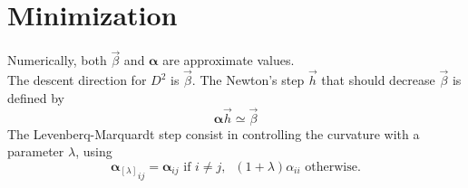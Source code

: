 \documentclass[aps,twocolumn]{revtex4}
\newcommand{\mymat}[1]{\bm{#1}}
\begin{document}
\section{Minimization}
Numerically, both $\vec{\beta}$ and $\mymat{\alpha}$ are approximate values.\\
The descent direction for $D^2$ is $\vec{\beta}$. The Newton's step $\vec{h}$ that should decrease $\vec{\beta}$ is defined by
\begin{equation}
	 \mymat{\alpha} \vec{h} \simeq \vec{\beta}
\end{equation}
The Levenberq-Marquardt step consist in controlling the curvature with a parameter $\lambda$, using
\begin{equation}
	{\mymat{\alpha}_{[\lambda]}}_{ij} = \mymat{\alpha}_{ij} \text{ if } i\not=j, \;\; (1+\lambda) \alpha_{ii} \text{ otherwise.}
\end{equation}
\end{document}
